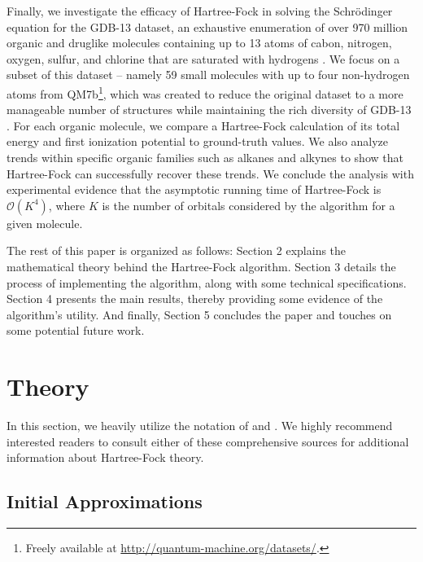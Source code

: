 \documentclass[12pt]{article}
\newcommand{\Oh}{\mathcal{O}}
\begin{document}
Finally, we investigate the efficacy of Hartree-Fock in solving the Schr\"odinger equation for the GDB-13 dataset, an exhaustive enumeration of over 970 million organic and druglike molecules containing up to 13 atoms of cabon, nitrogen, oxygen, sulfur, and chlorine that are saturated with hydrogens \cite{blum2009}.  We focus on a subset of this dataset -- namely 59 small molecules with up to four non-hydrogen atoms from QM7b\footnote{Freely available at \url{http://quantum-machine.org/datasets/}.}, which was created to reduce the original dataset to a more manageable number of structures while maintaining the rich diversity of GDB-13 \cite{montavon2013}.  For each organic molecule, we compare a Hartree-Fock calculation of its total energy and first ionization potential to ground-truth values.  We also analyze trends within specific organic families such as alkanes and alkynes to show that Hartree-Fock can successfully recover these trends.  We conclude the analysis with experimental evidence that the asymptotic running time of Hartree-Fock is $\Oh(K^4)$, where $K$ is the number of orbitals considered by the algorithm for a given molecule.

The rest of this paper is organized as follows: Section 2 explains the mathematical theory behind the Hartree-Fock algorithm.  Section 3 details the process of implementing the algorithm, along with some technical specifications.  Section 4 presents the main results, thereby providing some evidence of the algorithm's utility.  And finally, Section 5 concludes the paper and touches on some potential future work.  

\section{Theory}

In this section, we heavily utilize the notation of \cite{sherrill2001} and \cite{szabo2012}.  We highly recommend interested readers to consult either of these comprehensive sources for additional information about Hartree-Fock theory.

\subsection{Initial Approximations}
\end{document}
